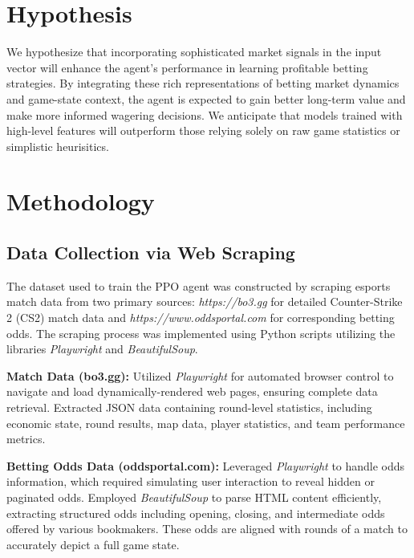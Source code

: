 \documentclass[sigconf]{acmart}
\begin{document}
\section{Hypothesis}

We hypothesize that incorporating sophisticated market signals in the input vector will enhance the agent's performance in learning profitable betting strategies. By integrating these rich representations of betting market dynamics and game-state context, the agent is expected to gain better long-term value and make more informed wagering decisions. We anticipate that models trained with high-level features will outperform those relying solely on raw game statistics or simplistic heurisitics.

\section{Methodology}

\subsection{Data Collection via Web Scraping}
The dataset used to train the PPO agent was constructed by scraping esports match data from two primary sources: \textit{https://bo3.gg} for detailed Counter-Strike 2 (CS2) match data and \textit{https://www.oddsportal.com} for corresponding betting odds. The scraping process was implemented using Python scripts utilizing the libraries \textit{Playwright} and \textit{BeautifulSoup}.

\bigskip

\textbf{Match Data (bo3.gg):}
Utilized \textit{Playwright} for automated browser control to navigate and load dynamically-rendered web pages, ensuring complete data retrieval.
Extracted JSON data containing round-level statistics, including economic state, round results, map data, player statistics, and team performance metrics.

\bigskip

\textbf{Betting Odds Data (oddsportal.com):}
Leveraged \textit{Playwright} to handle odds information, which required simulating user interaction to reveal hidden or paginated odds. Employed \textit{BeautifulSoup} to parse HTML content efficiently, extracting structured odds including opening, closing, and intermediate odds offered by various bookmakers. These odds are aligned with rounds of a match to accurately depict a full game state.

\bigskip
\end{document}

